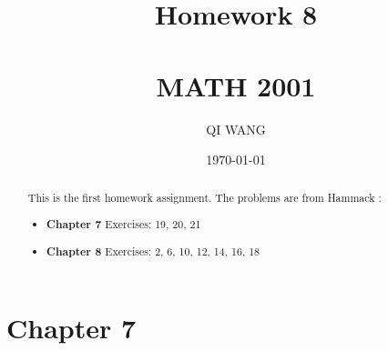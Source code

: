 \documentclass[12pt]{amsart}
\numberwithin{equation}{section}
\theoremstyle{definition}
\theoremstyle{remark}
\begin{document}




\author[QI]{QI WANG}
\address{University of Colorado, Department of Mathematics,  Campus Box 395,
Boulder, CO 80309-0395}
\date{\today}



\title[Homework 8]{Homework 8 \\ \ \\  MATH 2001}

\begin{abstract} 
This is the first homework assignment.  The problems are from Hammack \cite[Ch.~1, \S 1.1]{H13}:
\begin{itemize}

\item \textbf{Chapter 7}  
Exercises:  19, 20, 21

\item \textbf{Chapter 8}  
Exercises:  2, 6, 10, 12, 14, 16, 18

\end{itemize}
\end{abstract}


\maketitle


\tableofcontents





\section*{Chapter 7}


\end{document}
